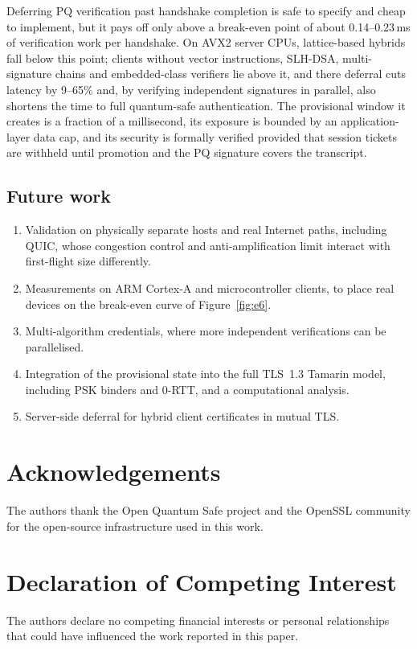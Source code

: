 \documentclass[preprint,10pt,3p]{elsarticle}
\begin{document}
Deferring PQ verification past handshake completion is safe to specify and
cheap to implement, but it pays off only above a break-even point of about
0.14--0.23\,ms of verification work per handshake.  On AVX2 server CPUs,
lattice-based hybrids fall below this point; clients without vector
instructions, SLH-DSA, multi-signature chains and embedded-class verifiers
lie above it, and there deferral cuts latency by 9--65\% and, by verifying
independent signatures in parallel, also shortens the time to full
quantum-safe authentication.  The provisional window it creates is a
fraction of a millisecond, its exposure is bounded by an
application-layer data cap, and its security is formally verified
provided that session tickets are withheld until promotion and the PQ
signature covers the transcript.

\subsection*{Future work}
\begin{enumerate}[noitemsep]
\item Validation on physically separate hosts and real Internet paths,
  including QUIC, whose congestion control and anti-amplification limit
  interact with first-flight size differently.
\item Measurements on ARM Cortex-A and microcontroller clients, to place
  real devices on the break-even curve of Figure~\ref{fig:e6}.
\item Multi-algorithm credentials, where more independent verifications
  can be parallelised.
\item Integration of the provisional state into the full TLS~1.3 Tamarin
  model, including PSK binders and 0-RTT, and a computational analysis.
\item Server-side deferral for hybrid client certificates in mutual TLS.
\end{enumerate}

\section*{Acknowledgements}
The authors thank the Open Quantum Safe project and the OpenSSL community
for the open-source infrastructure used in this work.

\section*{Declaration of Competing Interest}
The authors declare no competing financial interests or personal
relationships that could have influenced the work reported in this paper.



\end{document}
